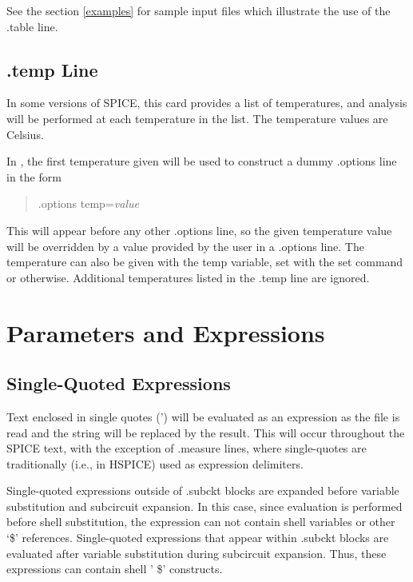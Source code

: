 See the section \ref{examples} for sample input files which illustrate
the use of the {\vt .table} line.

\subsection{{\vt .temp} Line}

In some versions of SPICE, this card provides a list of temperatures,
and analysis will be performed at each temperature in the list.  The
temperature values are Celsius.

In {\WRspice}, the first temperature given will be used to construct a
dummy {\vt .options} line in the form
\begin{quote}
{\vt .options temp=}{\it value}
\end{quote}
This will appear before any other {\vt .options} line, so the given
temperature value will be overridden by a value provided by the user
in a {\vt .options} line.  The temperature can also be given with the
{\et temp} variable, set with the {\cb set} command or otherwise. 
Additional temperatures listed in the {\vt .temp} line are ignored. 

\section{Parameters and Expressions}


\subsection{Single-Quoted Expressions}
Text enclosed in single quotes (') will be evaluated as an expression
as the file is read and the string will be replaced by the result. 
This will occur throughout the SPICE text, with the exception of {\vt
.measure} lines, where single-quotes are traditionally (i.e., in
HSPICE) used as expression delimiters.

Single-quoted expressions outside of {\vt .subckt} blocks are expanded
before variable substitution and subcircuit expansion.  In this case,
since evaluation is performed before shell substitution, the
expression can not contain shell variables or other `{\vt \$}'
references.  Single-quoted expressions that appear within {\vt
.subckt} blocks are evaluated after variable substitution during
subcircuit expansion.  Thus, these expressions can contain shell '{\vt
\$}' constructs.

